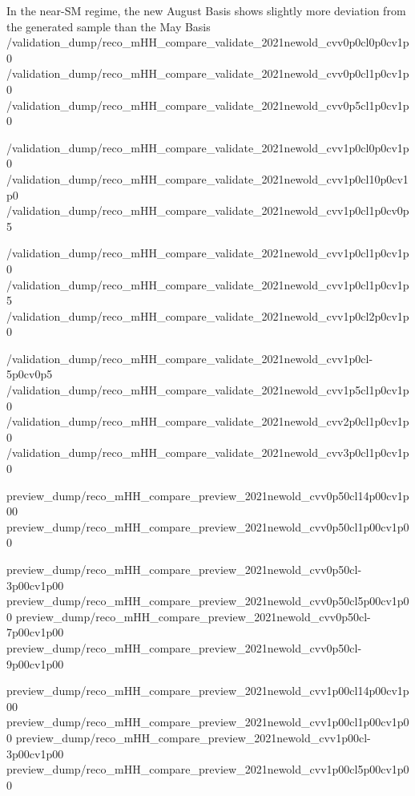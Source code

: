 
{In the near-SM regime, the new August Basis shows slightly more deviation
    from the generated sample than the May Basis}
{/validation_dump/reco_mHH_compare_validate_2021newold_cvv0p0cl0p0cv1p0}
{/validation_dump/reco_mHH_compare_validate_2021newold_cvv0p0cl1p0cv1p0}
{/validation_dump/reco_mHH_compare_validate_2021newold_cvv0p5cl1p0cv1p0}

{/validation_dump/reco_mHH_compare_validate_2021newold_cvv1p0cl0p0cv1p0}
{/validation_dump/reco_mHH_compare_validate_2021newold_cvv1p0cl10p0cv1p0}
{/validation_dump/reco_mHH_compare_validate_2021newold_cvv1p0cl1p0cv0p5}

{/validation_dump/reco_mHH_compare_validate_2021newold_cvv1p0cl1p0cv1p0}
{/validation_dump/reco_mHH_compare_validate_2021newold_cvv1p0cl1p0cv1p5}
{/validation_dump/reco_mHH_compare_validate_2021newold_cvv1p0cl2p0cv1p0}

{/validation_dump/reco_mHH_compare_validate_2021newold_cvv1p0cl-5p0cv0p5}
{/validation_dump/reco_mHH_compare_validate_2021newold_cvv1p5cl1p0cv1p0}
{/validation_dump/reco_mHH_compare_validate_2021newold_cvv2p0cl1p0cv1p0}
{/validation_dump/reco_mHH_compare_validate_2021newold_cvv3p0cl1p0cv1p0}




{preview_dump/reco_mHH_compare_preview_2021newold_cvv0p50cl14p00cv1p00}
{preview_dump/reco_mHH_compare_preview_2021newold_cvv0p50cl1p00cv1p00}

{preview_dump/reco_mHH_compare_preview_2021newold_cvv0p50cl-3p00cv1p00}
{preview_dump/reco_mHH_compare_preview_2021newold_cvv0p50cl5p00cv1p00}
{preview_dump/reco_mHH_compare_preview_2021newold_cvv0p50cl-7p00cv1p00}
{preview_dump/reco_mHH_compare_preview_2021newold_cvv0p50cl-9p00cv1p00}

{preview_dump/reco_mHH_compare_preview_2021newold_cvv1p00cl14p00cv1p00}
{preview_dump/reco_mHH_compare_preview_2021newold_cvv1p00cl1p00cv1p00}
{preview_dump/reco_mHH_compare_preview_2021newold_cvv1p00cl-3p00cv1p00}
{preview_dump/reco_mHH_compare_preview_2021newold_cvv1p00cl5p00cv1p00}

